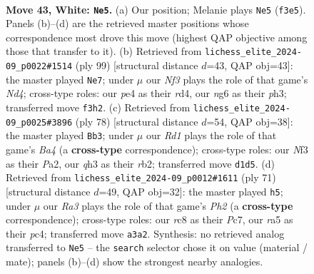 \documentclass[11pt]{article}
\begin{document}
\clearpage

\begin{figure}[p]\centering
\begin{subfigure}{0.46\textwidth}\centering
\resizebox{\linewidth}{!}{%
\newchessgame
\chessboard[
  setfen={2r3k1/6p1/1p4n1/r2p4/P3p3/R4N1q/2P2P2/3R2K1 w - - 0 43},
  showmover=false,
  pgfstyle=straightmove, color=movearrow, markmove={f3-e5}
]}
\caption{}
\end{subfigure}\hfill
\begin{subfigure}{0.46\textwidth}\centering
\resizebox{\linewidth}{!}{%
\newchessgame
\chessboard[
  setfen={r4k2/5p2/p1Rp3r/P2n4/3R4/2P4P/5pPK/5N2 b - - 2 50},
  showmover=false,
  pgfstyle=straightmove, color=movearrow, markmove={d5-e7}
]}
\caption{}
\end{subfigure}
\\[4pt]
\begin{subfigure}{0.46\textwidth}\centering
\resizebox{\linewidth}{!}{%
\newchessgame
\chessboard[
  setfen={1r4k1/5p2/3p1np1/4p3/B3P3/2P3N1/Pr2R2K/8 w - - 0 40},
  showmover=false,
  pgfstyle=straightmove, color=movearrow, markmove={a4-b3}
]}
\caption{}
\end{subfigure}\hfill
\begin{subfigure}{0.46\textwidth}\centering
\resizebox{\linewidth}{!}{%
\newchessgame
\chessboard[
  setfen={8/ppp4p/5k2/2p3p1/2P2r2/1P3n1P/P5R1/5R1K b - - 3 36},
  showmover=false,
  pgfstyle=straightmove, color=movearrow, markmove={h7-h5}
]}
\caption{}
\end{subfigure}
\caption{\textbf{Move 43, White: \texttt{Ne5}.} (a) Our position; Melanie plays \texttt{Ne5} (\texttt{f3e5}). Panels (b)--(d) are the retrieved master positions whose correspondence most drove this move (highest QAP objective among those that transfer to it). (b) Retrieved from \texttt{lichess\_elite\_2024-09\_p0022\#1514} (ply 99) [structural distance $d$=43, QAP obj=43]: the master played \texttt{Ne7}; under $\mu$ our \emph{Nf3} plays the role of that game's \emph{Nd4}; cross-type roles: our \emph{p}e4 as their \emph{r}d4, our \emph{n}g6 as their \emph{p}h3; transferred move \texttt{f3h2}. (c) Retrieved from \texttt{lichess\_elite\_2024-09\_p0025\#3896} (ply 78) [structural distance $d$=54, QAP obj=38]: the master played \texttt{Bb3}; under $\mu$ our \emph{Rd1} plays the role of that game's \emph{Ba4} (a \textbf{cross-type} correspondence); cross-type roles: our \emph{N}f3 as their \emph{P}a2, our \emph{q}h3 as their \emph{r}b2; transferred move \texttt{d1d5}. (d) Retrieved from \texttt{lichess\_elite\_2024-09\_p0012\#1611} (ply 71) [structural distance $d$=49, QAP obj=32]: the master played \texttt{h5}; under $\mu$ our \emph{Ra3} plays the role of that game's \emph{Ph2} (a \textbf{cross-type} correspondence); cross-type roles: our \emph{r}c8 as their \emph{P}c7, our \emph{r}a5 as their \emph{p}c4; transferred move \texttt{a3a2}. Synthesis: no retrieved analog transferred to \texttt{Ne5} -- the \texttt{search} selector chose it on value (material / mate); panels (b)--(d) show the strongest nearby analogies.}
\label{fig:thought-m84}
\end{figure}
\end{document}
